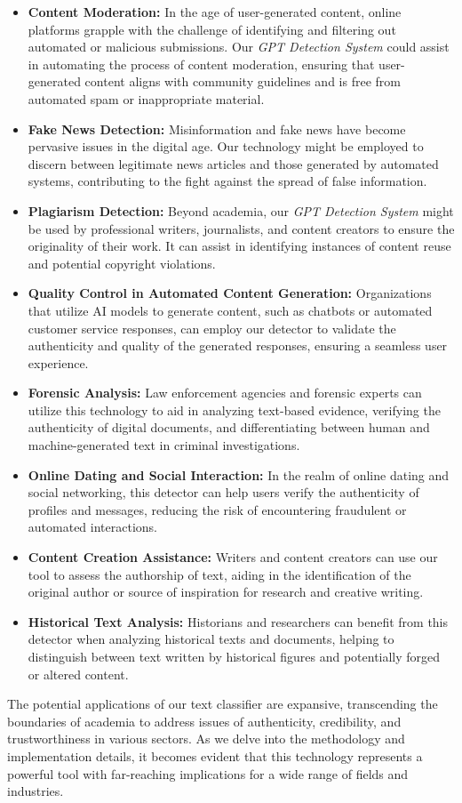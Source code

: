 \begin{itemize}
 \item \textbf{Content Moderation:} In the age of user-generated content, online platforms grapple with the challenge of 
    identifying and filtering out automated or malicious submissions. Our \textit{GPT Detection System} could assist 
    in automating the process of content moderation, ensuring that user-generated content aligns with community 
    guidelines and is free from automated spam or inappropriate material.
 \item \textbf{Fake News Detection:} Misinformation and fake news have become pervasive issues in the digital age. 
    Our technology might be employed to discern between legitimate news articles and those generated by automated systems, 
    contributing to the fight against the spread of false information.
 \item \textbf{Plagiarism Detection:} Beyond academia, our \textit{GPT Detection System} might be used by professional 
    writers, journalists, and content creators to ensure the originality of their work. 
    It can assist in identifying instances of content reuse and potential copyright violations.
 \item \textbf{Quality Control in Automated Content Generation:} Organizations that utilize AI models to generate content, 
    such as chatbots or automated customer service responses, can employ our detector to validate the authenticity 
    and quality of the generated responses, ensuring a seamless user experience.
 \item \textbf{Forensic Analysis:} Law enforcement agencies and forensic experts can utilize this technology to aid 
    in analyzing text-based evidence, verifying the authenticity of digital documents, and differentiating 
    between human and machine-generated text in criminal investigations.
 \item \textbf{Online Dating and Social Interaction:} In the realm of online dating and social networking, this detector 
    can help users verify the authenticity of profiles and messages, reducing the risk of encountering fraudulent 
    or automated interactions.
 \item \textbf{Content Creation Assistance:} Writers and content creators can use our tool to assess the authorship 
    of text, aiding in the identification of the original author or source of inspiration for research and creative writing.
 \item \textbf{Historical Text Analysis:} Historians and researchers can benefit from this detector when analyzing 
    historical texts and documents, helping to distinguish between text written by historical figures and potentially 
    forged or altered content.
\end{itemize}

The potential applications of our text classifier are expansive, transcending the boundaries of academia to address 
issues of authenticity, credibility, and trustworthiness in various sectors. As we delve into the methodology 
and implementation details, it becomes evident that this technology represents a powerful tool with far-reaching
implications for a wide range of fields and industries.